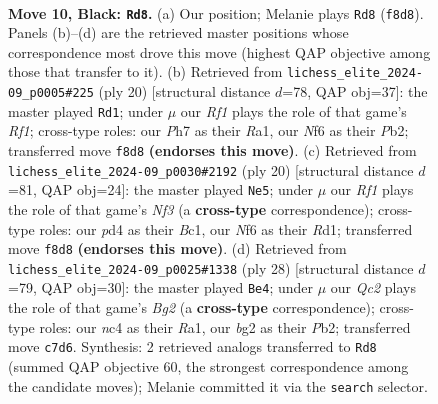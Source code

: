 \documentclass[11pt]{article}
\begin{document}
\begin{figure}[p]
\label{fig:thought-m17}
\end{figure}

\clearpage

\begin{figure}[p]\centering
\begin{subfigure}{0.46\textwidth}\centering
\resizebox{\linewidth}{!}{%
\newchessgame
\chessboard[
  setfen={r1b2rk1/ppq1bppp/n1p1pn2/8/2NP4/1P3PP1/P3P1BP/RNBQ1RK1 b - - 0 10},
  showmover=false,
  pgfstyle=straightmove, color=movearrow, markmove={f8-d8}
]}
\caption{}
\end{subfigure}\hfill
\begin{subfigure}{0.46\textwidth}\centering
\resizebox{\linewidth}{!}{%
\newchessgame
\chessboard[
  setfen={r1bq1rk1/pp3pbp/2p2np1/4p3/2P5/2N3P1/PPQ1PPBP/R1B2RK1 w - - 0 11},
  showmover=false,
  pgfstyle=straightmove, color=movearrow, markmove={f1-d1}
]}
\caption{}
\end{subfigure}
\\[4pt]
\begin{subfigure}{0.46\textwidth}\centering
\resizebox{\linewidth}{!}{%
\newchessgame
\chessboard[
  setfen={r1bq1rk1/pp3pp1/2pbpn1p/8/2BP4/5N2/PPP1QPPP/R1BR2K1 w - - 2 11},
  showmover=false,
  pgfstyle=straightmove, color=movearrow, markmove={f3-e5}
]}
\caption{}
\end{subfigure}\hfill
\begin{subfigure}{0.46\textwidth}\centering
\resizebox{\linewidth}{!}{%
\newchessgame
\chessboard[
  setfen={r2q1rk1/1p1nbpp1/2p1p1bp/p7/P7/3PN1P1/1PP1QPBP/R1B2RK1 w - - 2 15},
  showmover=false,
  pgfstyle=straightmove, color=movearrow, markmove={g2-e4}
]}
\caption{}
\end{subfigure}
\caption{\textbf{Move 10, Black: \texttt{Rd8}.} (a) Our position; Melanie plays \texttt{Rd8} (\texttt{f8d8}). Panels (b)--(d) are the retrieved master positions whose correspondence most drove this move (highest QAP objective among those that transfer to it). (b) Retrieved from \texttt{lichess\_elite\_2024-09\_p0005\#225} (ply 20) [structural distance $d$=78, QAP obj=37]: the master played \texttt{Rd1}; under $\mu$ our \emph{Rf1} plays the role of that game's \emph{Rf1}; cross-type roles: our \emph{P}h7 as their \emph{R}a1, our \emph{N}f6 as their \emph{P}b2; transferred move \texttt{f8d8} \textbf{(endorses this move)}. (c) Retrieved from \texttt{lichess\_elite\_2024-09\_p0030\#2192} (ply 20) [structural distance $d$=81, QAP obj=24]: the master played \texttt{Ne5}; under $\mu$ our \emph{Rf1} plays the role of that game's \emph{Nf3} (a \textbf{cross-type} correspondence); cross-type roles: our \emph{p}d4 as their \emph{B}c1, our \emph{N}f6 as their \emph{R}d1; transferred move \texttt{f8d8} \textbf{(endorses this move)}. (d) Retrieved from \texttt{lichess\_elite\_2024-09\_p0025\#1338} (ply 28) [structural distance $d$=79, QAP obj=30]: the master played \texttt{Be4}; under $\mu$ our \emph{Qc2} plays the role of that game's \emph{Bg2} (a \textbf{cross-type} correspondence); cross-type roles: our \emph{n}c4 as their \emph{R}a1, our \emph{b}g2 as their \emph{P}b2; transferred move \texttt{c7d6}. Synthesis: 2 retrieved analogs transferred to \texttt{Rd8} (summed QAP objective 60, the strongest correspondence among the candidate moves); Melanie committed it via the \texttt{search} selector.}

\end{figure}
\end{document}
